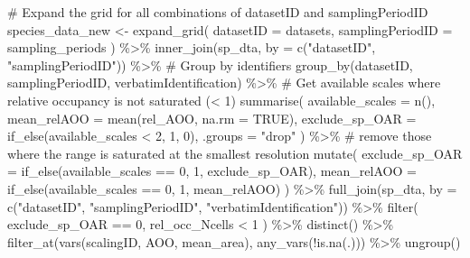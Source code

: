 \documentclass[
  letterpaper,
  DIV=11,
  numbers=noendperiod]{scrreprt}
\newenvironment{Shaded}{\begin{snugshade}}{\end{snugshade}}
\newcommand{\AttributeTok}[1]{\textcolor[rgb]{0.40,0.45,0.13}{#1}}
\newcommand{\CommentTok}[1]{\textcolor[rgb]{0.37,0.37,0.37}{#1}}
\newcommand{\ConstantTok}[1]{\textcolor[rgb]{0.56,0.35,0.01}{#1}}
\newcommand{\DecValTok}[1]{\textcolor[rgb]{0.68,0.00,0.00}{#1}}
\newcommand{\FunctionTok}[1]{\textcolor[rgb]{0.28,0.35,0.67}{#1}}
\newcommand{\NormalTok}[1]{\textcolor[rgb]{0.00,0.23,0.31}{#1}}
\newcommand{\OtherTok}[1]{\textcolor[rgb]{0.00,0.23,0.31}{#1}}
\newcommand{\SpecialCharTok}[1]{\textcolor[rgb]{0.37,0.37,0.37}{#1}}
\newcommand{\StringTok}[1]{\textcolor[rgb]{0.13,0.47,0.30}{#1}}
\begin{document}
\begin{Shaded}
\begin{Highlighting}[]
  \CommentTok{\# Expand the grid for all combinations of datasetID and samplingPeriodID}
\NormalTok{  species\_data\_new }\OtherTok{\textless{}{-}} \FunctionTok{expand\_grid}\NormalTok{(}
    \AttributeTok{datasetID =}\NormalTok{ datasets,}
    \AttributeTok{samplingPeriodID =}\NormalTok{ sampling\_periods}
\NormalTok{  ) }\SpecialCharTok{\%\textgreater{}\%}
    \FunctionTok{inner\_join}\NormalTok{(sp\_dta, }\AttributeTok{by =} \FunctionTok{c}\NormalTok{(}\StringTok{"datasetID"}\NormalTok{, }\StringTok{"samplingPeriodID"}\NormalTok{)) }\SpecialCharTok{\%\textgreater{}\%}
    \CommentTok{\# Group by identifiers}
    \FunctionTok{group\_by}\NormalTok{(datasetID, samplingPeriodID, verbatimIdentification) }\SpecialCharTok{\%\textgreater{}\%}
    \CommentTok{\# Get available scales where relative occupancy is not saturated (\textless{} 1)}
    \FunctionTok{summarise}\NormalTok{(}
      \AttributeTok{available\_scales =} \FunctionTok{n}\NormalTok{(),}
      \AttributeTok{mean\_relAOO =} \FunctionTok{mean}\NormalTok{(rel\_AOO, }\AttributeTok{na.rm =} \ConstantTok{TRUE}\NormalTok{),}
      \AttributeTok{exclude\_sp\_OAR =} \FunctionTok{if\_else}\NormalTok{(available\_scales }\SpecialCharTok{\textless{}} \DecValTok{2}\NormalTok{, }\DecValTok{1}\NormalTok{, }\DecValTok{0}\NormalTok{),}
      \AttributeTok{.groups =} \StringTok{"drop"}
\NormalTok{    ) }\SpecialCharTok{\%\textgreater{}\%}
    \CommentTok{\# remove those where the range is saturated at the smallest resolution}
    \FunctionTok{mutate}\NormalTok{(}
      \AttributeTok{exclude\_sp\_OAR =} \FunctionTok{if\_else}\NormalTok{(available\_scales }\SpecialCharTok{==} \DecValTok{0}\NormalTok{, }\DecValTok{1}\NormalTok{, exclude\_sp\_OAR),}
      \AttributeTok{mean\_relAOO =} \FunctionTok{if\_else}\NormalTok{(available\_scales }\SpecialCharTok{==} \DecValTok{0}\NormalTok{, }\DecValTok{1}\NormalTok{, mean\_relAOO)}
\NormalTok{    ) }\SpecialCharTok{\%\textgreater{}\%}
    \FunctionTok{full\_join}\NormalTok{(sp\_dta, }\AttributeTok{by =} \FunctionTok{c}\NormalTok{(}\StringTok{"datasetID"}\NormalTok{, }\StringTok{"samplingPeriodID"}\NormalTok{, }\StringTok{"verbatimIdentification"}\NormalTok{)) }\SpecialCharTok{\%\textgreater{}\%}
    \FunctionTok{filter}\NormalTok{(}
\NormalTok{      exclude\_sp\_OAR }\SpecialCharTok{==} \DecValTok{0}\NormalTok{,}
\NormalTok{      rel\_occ\_Ncells }\SpecialCharTok{\textless{}} \DecValTok{1}
\NormalTok{    ) }\SpecialCharTok{\%\textgreater{}\%}
    \FunctionTok{distinct}\NormalTok{() }\SpecialCharTok{\%\textgreater{}\%}
    \FunctionTok{filter\_at}\NormalTok{(}\FunctionTok{vars}\NormalTok{(scalingID, AOO, mean\_area), }\FunctionTok{any\_vars}\NormalTok{(}\SpecialCharTok{!}\FunctionTok{is.na}\NormalTok{(.))) }\SpecialCharTok{\%\textgreater{}\%}
    \FunctionTok{ungroup}\NormalTok{()}


\end{Highlighting}
\end{Shaded}
\end{document}

